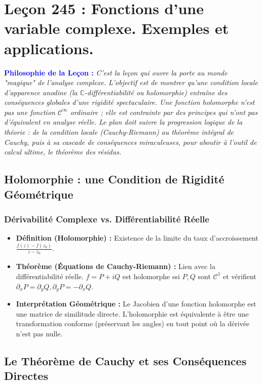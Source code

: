 \documentclass[12pt, a4paper, parskip=full]{report}
\theoremstyle{agregstyle}
\newenvironment{philosophie}
  {\par\medskip\noindent\begin{oframed}\noindent\textbf{\textcolor{blue}{Philosophie de la Leçon :}}\itshape}
  {\end{oframed}\par\medskip}
\begin{document}
\chapter{Leçon 245 : Fonctions d'une variable complexe. Exemples et applications.}

\begin{philosophie}
    C'est la leçon qui ouvre la porte au monde "magique" de l'analyse complexe. L'objectif est de montrer qu'une condition locale d'apparence anodine (la $\mathbb{C}$-différentiabilité ou holomorphie) entraîne des conséquences globales d'une rigidité spectaculaire. Une fonction holomorphe n'est pas une fonction $\mathcal{C}^\infty$ ordinaire ; elle est contrainte par des principes qui n'ont pas d'équivalent en analyse réelle. Le plan doit suivre la progression logique de la théorie : de la condition locale (Cauchy-Riemann) au théorème intégral de Cauchy, puis à sa cascade de conséquences miraculeuses, pour aboutir à l'outil de calcul ultime, le théorème des résidus.
\end{philosophie}

\section{Holomorphie : une Condition de Rigidité Géométrique}
\subsection{Dérivabilité Complexe vs. Différentiabilité Réelle}
\begin{itemize}
    \item \textbf{Définition (Holomorphie) :} Existence de la limite du taux d'accroissement $\frac{f(z)-f(z_0)}{z-z_0}$.
    \item \textbf{Théorème (Équations de Cauchy-Riemann) :} Lien avec la différentiabilité réelle. $f=P+iQ$ est holomorphe ssi $P,Q$ sont $\mathcal{C}^1$ et vérifient $\partial_x P = \partial_y Q, \partial_y P = -\partial_x Q$.
    \item \textbf{Interprétation Géométrique :} Le Jacobien d'une fonction holomorphe est une matrice de similitude directe. L'holomorphie est équivalente à être une transformation conforme (préservant les angles) en tout point où la dérivée n'est pas nulle.
\end{itemize}

\section{Le Théorème de Cauchy et ses Conséquences Directes}
\end{document}
